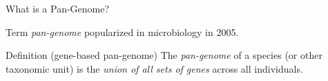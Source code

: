 \documentclass[notes=hide]{beamer}
\newcommand{\0}{\ensuremath{\mathtt{0}}}
\newcommand{\1}{\ensuremath{\mathtt{1}}}
\begin{document}
\begin{frame}[label=pangenomics]{What is a Pan-Genome?}
\begin{block}{}
Term \emph{pan-genome} popularized in microbiology in 2005.
\end{block}
\begin{block}{Definition (gene-based pan-genome)}
The \emph{pan-genome} of a species (or other taxonomic unit) is the \emph{union of all sets of genes} across all individuals.
\end{block}
\end{frame}
\end{document}

